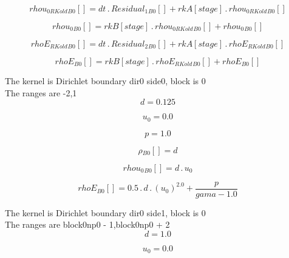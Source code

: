 \documentclass{article}
\begin{document}
\begin{dmath}{rhou_{0 RKold}{_{B0}}}[{}] = dt \,.\, {Residual_{1}{_{B0}}}[{}] + {rkA}[{stage}] \,.\, {rhou_{0 RKold}{_{B0}}}[{}]\end{dmath}

\begin{dmath}{rhou_{0}{_{B0}}}[{}] = {rkB}[{stage}] \,.\, {rhou_{0 RKold}{_{B0}}}[{}] + {rhou_{0}{_{B0}}}[{}]\end{dmath}

\begin{dmath}{rhoE_{RKold}{_{B0}}}[{}] = dt \,.\, {Residual_{2}{_{B0}}}[{}] + {rkA}[{stage}] \,.\, {rhoE_{RKold}{_{B0}}}[{}]\end{dmath}

\begin{dmath}{rhoE{_{B0}}}[{}] = {rkB}[{stage}] \,.\, {rhoE_{RKold}{_{B0}}}[{}] + {rhoE{_{B0}}}[{}]\end{dmath}

\noindent The kernel is Dirichlet boundary dir0 side0, block is 0\\\noindent The ranges are -2,1\\\begin{dmath}d = 0.125\end{dmath}

\begin{dmath}u_{0} = 0.0\end{dmath}

\begin{dmath}p = 1.0\end{dmath}

\begin{dmath}{\rho{_{B0}}}[{}] = d\end{dmath}

\begin{dmath}{rhou_{0}{_{B0}}}[{}] = d \,.\, u_{0}\end{dmath}

\begin{dmath}{rhoE{_{B0}}}[{}] = 0.5 \,.\, d \,.\, \left(u_{0} \right)^{2.0} + \frac{p}{gama - 1.0}\end{dmath}

\noindent The kernel is Dirichlet boundary dir0 side1, block is 0\\\noindent The ranges are block0np0 - 1,block0np0 + 2\\\begin{dmath}d = 1.0\end{dmath}

\begin{dmath}u_{0} = 0.0\end{dmath}
\end{document}
